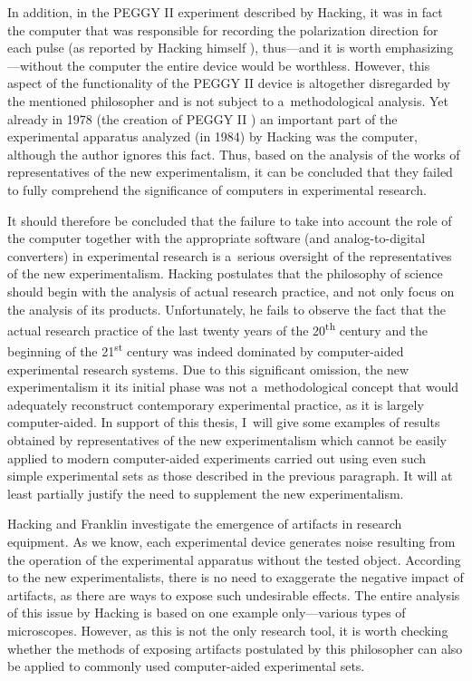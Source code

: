 In addition, in the PEGGY II experiment described by Hacking, it was in fact the computer that was responsible for recording the polarization direction for each pulse (as reported by Hacking himself 
\parencite[][p.164]{leplin_experimentation_1984}%
), thus---and it is worth emphasizing---without the computer the entire device would be worthless. However, this aspect of the functionality of the PEGGY II device is altogether disregarded by the mentioned philosopher and is not subject to a~methodological analysis. Yet already in 1978 (the creation of PEGGY II 
\parencite[][p.162]{leplin_experimentation_1984}%
) an important part of the experimental apparatus analyzed (in 1984) by Hacking was the computer, although the author ignores this fact. Thus, based on the analysis of the works of representatives of the new experimentalism, it can be concluded that they failed to fully comprehend the significance of computers in experimental research.



It should therefore be concluded that the failure to take into account the role of the computer together with the appropriate software (and analog-to-digital converters) in experimental research is a~serious oversight of the representatives of the new experimentalism. Hacking postulates that the philosophy of science should begin with the analysis of actual research practice, and not only focus on the analysis of its products. Unfortunately, he fails to observe the fact that the actual research practice of the last twenty years of the 20\textsuperscript{th} century and the beginning of the 21\textsuperscript{st} century was indeed dominated by computer-aided experimental research systems. Due to this significant omission, the new experimentalism it its initial phase was not a~methodological concept that would adequately reconstruct contemporary experimental practice, as it is largely computer-aided. In support of this thesis, I~will give some examples of results obtained by representatives of the new experimentalism which cannot be easily applied to modern computer-aided experiments carried out using even such simple experimental sets as those described in the previous paragraph. It will at least partially justify the need to supplement the new experimentalism.



Hacking and Franklin investigate the emergence of artifacts in research equipment. As we know, each experimental device generates noise resulting from the operation of the experimental apparatus without the tested object. According to the new experimentalists, there is no need to exaggerate the negative impact of artifacts, as there are ways to expose such undesirable effects. The entire analysis of this issue by Hacking is based on one example only---various types of microscopes. However, as this is not the only research tool, it is worth checking whether the methods of exposing artifacts postulated by this philosopher can also be applied to commonly used computer-aided experimental sets.



